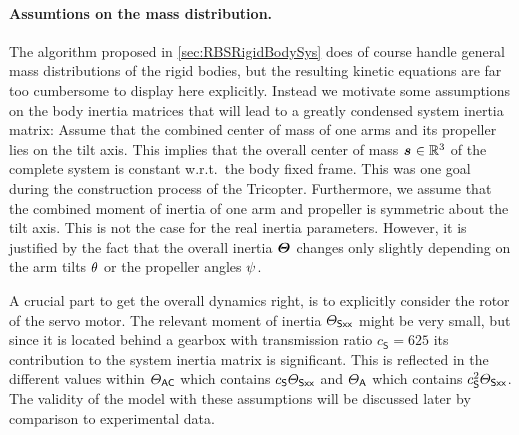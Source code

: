 \paragraph{Assumtions on the mass distribution.}
The algorithm proposed in \autoref{sec:RBSRigidBodySys} does of course handle general mass distributions of the rigid bodies, but the resulting kinetic equations are far too cumbersome to display here explicitly.
Instead we motivate some assumptions on the body inertia matrices that will lead to a greatly condensed system inertia matrix:
Assume that the combined center of mass of one arms and its propeller lies on the tilt axis.
This implies that the overall center of mass $\bodyCOM{}{}{} \in \RealNum^{3}$ of the complete system is constant w.r.t.\ the body fixed frame.
This was one goal during the construction process of the Tricopter.
Furthermore, we assume that the combined moment of inertia of one arm and propeller is symmetric about the tilt axis.
This is not the case for the real inertia parameters.
However, it is justified by the fact that the overall inertia $\bodyMOI{}{}{}$ changes only slightly depending on the arm tilts $\theta_{}$ or the propeller angles $\psi_{}$.  

A crucial part to get the overall dynamics right, is to explicitly consider the rotor of the servo motor.
The relevant moment of inertia $\varTheta_{\textsf{Sxx}}$ might be very small, but since it is located behind a gearbox with transmission ratio $c_{\mathsf{S}} = 625$ its contribution to the system inertia matrix is significant.
This is reflected in the different values within $\varTheta_{\mathsf{AC}}$ which contains $c_{\mathsf{S}} \varTheta_{\textsf{Sxx}}$ and $\varTheta_{\mathsf{A}}$ which contains $c_{\mathsf{S}}^2 \varTheta_{\textsf{Sxx}}$.
The validity of the model with these assumptions will be discussed later by comparison to experimental data.

